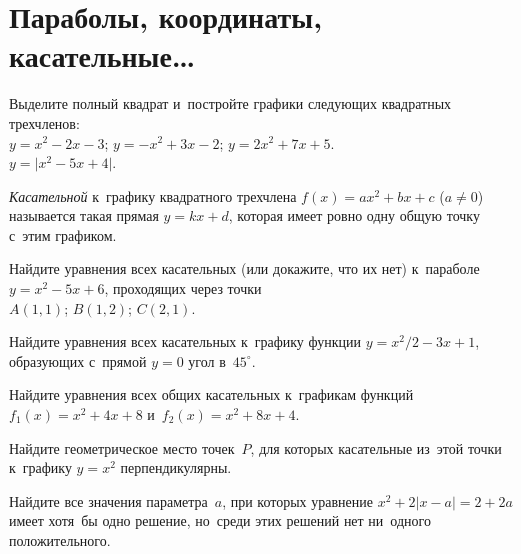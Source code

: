 
\section*{Параболы, координаты, касательные\ldots}

\begingroup
    \def\abs#1{\lvert #1 \rvert}%

\begin{problems}

\item
Выделите полный квадрат и~постройте графики следующих квадратных трехчленов:
\\
\subproblem $y = x^2 - 2 x - 3$;
\qquad
\subproblem $y = - x^2 + 3 x - 2$;
\qquad
\subproblem $y = 2 x^2 + 7 x + 5$.
\\
\subproblem $y = \abs{x^2 - 5 x + 4}$.

\end{problems}

\emph{Касательной} к~графику квадратного трехчлена $f(x) = a x^2 + b x + c$
($a \neq 0$) называется такая прямая $y = k x + d$, которая имеет ровно одну
общую точку с~этим графиком.

\begin{problems}

\item
Найдите уравнения всех касательных (или докажите, что их нет) к~параболе
$y = x^2 - 5 x + 6$, проходящих через точки
\\
\subproblem $A (1, 1)$;
\qquad
\subproblem $B (1, 2)$;
\qquad
\subproblem $C (2, 1)$.

\item
Найдите уравнения всех касательных к~графику функции $y = x^2 / 2 - 3 x + 1$,
образующих с~прямой $y = 0$ угол в~$45^{\circ}$.

\item
Найдите уравнения всех общих касательных к~графикам функций
$f_1(x) = x^2 + 4 x + 8$ и~$f_2(x) = x^2 + 8 x + 4$.


\item
Найдите геометрическое место точек~$P$, для которых касательные из~этой точки
к~графику $y = x^2$ перпендикулярны.


\item
Найдите все значения параметра~$a$, при которых уравнение
$x^2 + 2 \abs{x - a} = 2 + 2 a$ имеет хотя~бы одно решение, но~среди этих
решений нет ни~одного положительного.

\end{problems}

\endgroup %


